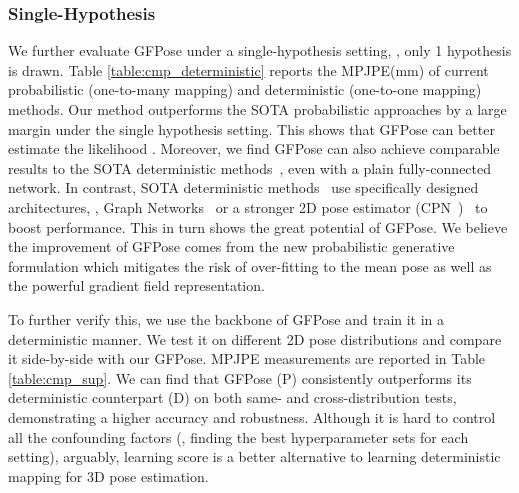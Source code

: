 \documentclass[10pt,twocolumn,letterpaper]{article}
\begin{document}
\subsubsection{Single-Hypothesis}
We further evaluate GFPose under a single-hypothesis setting, \ie, only 1 hypothesis is drawn. Table \ref{table:cmp_deterministic} reports the MPJPE(mm) of current probabilistic (one-to-many mapping) and deterministic (one-to-one mapping) methods. Our method outperforms the SOTA probabilistic approaches by a large margin under the single hypothesis setting. This shows that GFPose can better estimate the likelihood . 
Moreover, we find GFPose can also achieve comparable results to the SOTA deterministic methods~\cite{zeng2020srnet}, even with a plain fully-connected network. In contrast, SOTA deterministic methods~\cite{ci2019optimizing, zeng2020srnet} use specifically designed architectures, \eg, Graph Networks~\cite{ci2019optimizing, zeng2020srnet} or a stronger 2D pose estimator (CPN~\cite{chen2018cascaded})~\cite{pavllo20193d, zeng2020srnet} to boost performance. This in turn shows the great potential of GFPose. We believe the improvement of GFPose comes from the new probabilistic generative formulation which mitigates the risk of over-fitting to the mean pose as well as the powerful gradient field representation.

To further verify this, we use the backbone of GFPose and train it in a deterministic manner. We test it on different 2D pose distributions and compare it side-by-side with our GFPose. MPJPE measurements are reported in Table \ref{table:cmp_sup}. We can find that GFPose (P) consistently outperforms its deterministic counterpart (D) on both same- and cross-distribution tests, demonstrating a higher accuracy and robustness. Although it is hard to control all the confounding factors (\eg, finding the best hyperparameter sets for each setting), arguably, learning score is a better alternative to learning deterministic mapping for 3D pose estimation.
\end{document}
